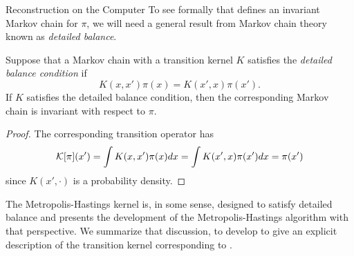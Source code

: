 \begin{chapter}{Reconstruction on the Computer}
To see formally that  defines an invariant Markov chain for $\pi$, we will need a general result from Markov chain theory known as \emph{detailed balance}.
\begin{thm}
  Suppose that a Markov chain with a transition kernel $K$ satisfies the \emph{detailed balance condition} if
  \begin{equation} \label{eq:detailedBalance}
    K(x,x')\pi(x) = K(x',x) \pi(x').
  \end{equation}
  If $K$ satisfies the detailed balance condition, then the corresponding Markov chain is invariant with respect to $\pi$.
\end{thm}
\begin{proof}
  The corresponding transition operator has
  \begin{equation}
    \mathcal K[\pi](x') = \int K(x,x') \pi(x)dx = \int K(x',x)\pi(x')dx = \pi(x')
  \end{equation}
  since $K(x',\cdot)$ is a probability density.
\end{proof}
The Metropolis-Hastings kernel is, in some sense, designed to satisfy detailed balance and \citep{calvetti2007introduction} presents the development of the Metropolis-Hastings algorithm with that perspective.
We summarize that discussion, to develop to give an explicit description of the transition kernel corresponding to .


\end{chapter}
